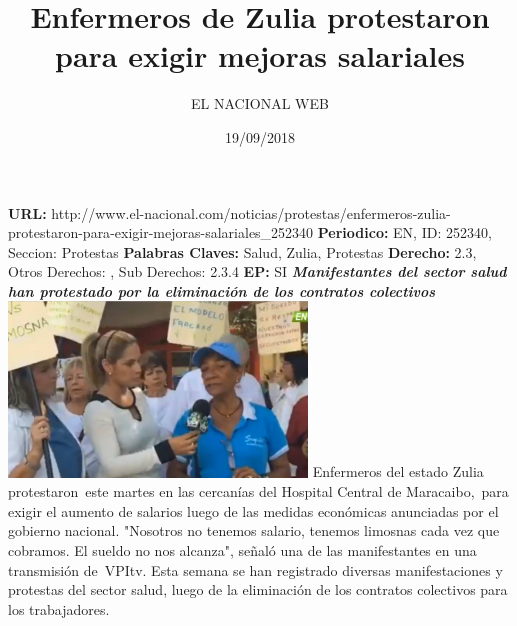 \documentclass{article}%
\title{\textbf{Enfermeros de Zulia protestaron para exigir mejoras salariales}}%
\author{EL NACIONAL WEB}%
\date{19/09/2018}%
\begin{document}
%
\normalsize%
\maketitle%
\textbf{URL: }%
http://www.el{-}nacional.com/noticias/protestas/enfermeros{-}zulia{-}protestaron{-}para{-}exigir{-}mejoras{-}salariales\_252340\newline%
%
\textbf{Periodico: }%
EN, %
ID: %
252340, %
Seccion: %
Protestas\newline%
%
\textbf{Palabras Claves: }%
Salud, Zulia, Protestas\newline%
%
\textbf{Derecho: }%
2.3, %
Otros Derechos: %
, %
Sub Derechos: %
2.3.4\newline%
%
\textbf{EP: }%
SI\newline%
\newline%
%
\textbf{\textit{Manifestantes del sector salud han protestado por la eliminación de los contratos colectivos}}%
\newline%
\newline%
%
\includegraphics[width=300px]{143.jpg}%
\newline%
%
Enfermeros del estado Zulia protestaron~este martes en las cercanías del Hospital Central de Maracaibo,~para exigir el aumento de salarios luego de las medidas económicas anunciadas por el gobierno nacional.%
\newline%
%
"Nosotros no tenemos salario, tenemos limosnas cada vez que cobramos. El sueldo no nos alcanza", señaló una de las manifestantes en una transmisión de~VPItv.%
\newline%
%
Esta semana se han registrado diversas manifestaciones y protestas del sector salud, luego de la eliminación de los contratos colectivos para los trabajadores.%
\newline%
%
\end{document}
